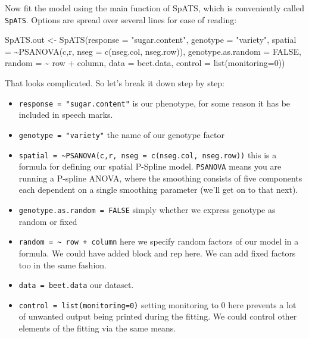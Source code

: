 \documentclass[
]{book}
\newenvironment{Shaded}{\begin{snugshade}}{\end{snugshade}}
\newcommand{\AttributeTok}[1]{\textcolor[rgb]{0.77,0.63,0.00}{#1}}
\newcommand{\ConstantTok}[1]{\textcolor[rgb]{0.00,0.00,0.00}{#1}}
\newcommand{\DecValTok}[1]{\textcolor[rgb]{0.00,0.00,0.81}{#1}}
\newcommand{\FunctionTok}[1]{\textcolor[rgb]{0.00,0.00,0.00}{#1}}
\newcommand{\NormalTok}[1]{#1}
\newcommand{\OtherTok}[1]{\textcolor[rgb]{0.56,0.35,0.01}{#1}}
\newcommand{\SpecialCharTok}[1]{\textcolor[rgb]{0.00,0.00,0.00}{#1}}
\newcommand{\StringTok}[1]{\textcolor[rgb]{0.31,0.60,0.02}{#1}}
\providecommand{\tightlist}{%
  \setlength{\itemsep}{0pt}\setlength{\parskip}{0pt}}
\begin{document}
Now fit the model using the main function of SpATS, which is conveniently called \texttt{SpATS}. Options are spread over several lines for ease of reading:

\begin{Shaded}
\begin{Highlighting}[]
\NormalTok{SpATS.out }\OtherTok{\textless{}{-}} \FunctionTok{SpATS}\NormalTok{(}\AttributeTok{response =} \StringTok{"sugar.content"}\NormalTok{,}
    \AttributeTok{genotype =} \StringTok{"variety"}\NormalTok{,}
    \AttributeTok{spatial =} \SpecialCharTok{\textasciitilde{}}\FunctionTok{PSANOVA}\NormalTok{(c,r, }\AttributeTok{nseg =} \FunctionTok{c}\NormalTok{(nseg.col, nseg.row)),}
    \AttributeTok{genotype.as.random =} \ConstantTok{FALSE}\NormalTok{,}
    \AttributeTok{random =} \SpecialCharTok{\textasciitilde{}}\NormalTok{ row }\SpecialCharTok{+}\NormalTok{ column,}
    \AttributeTok{data =}\NormalTok{ beet.data,}
    \AttributeTok{control =} \FunctionTok{list}\NormalTok{(}\AttributeTok{monitoring=}\DecValTok{0}\NormalTok{))}
\end{Highlighting}
\end{Shaded}

That looks complicated. So let's break it down step by step:

\begin{itemize}
\tightlist
\item
  \texttt{response\ =\ "sugar.content"} is our phenotype, for some reason it has be included in speech marks.
\item
  \texttt{genotype\ =\ "variety"} the name of our genotype factor\\
\item
  \texttt{spatial\ =\ \textasciitilde{}PSANOVA(c,r,\ nseg\ =\ c(nseg.col,\ nseg.row))} this is a formula for defining our spatial P-Spline model. \texttt{PSANOVA} means you are running a P-spline ANOVA, where the smoothing consists of five components each dependent on a single smoothing parameter (we'll get on to that next).
\item
  \texttt{genotype.as.random\ =\ FALSE} simply whether we express genotype as random or fixed
\item
  \texttt{random\ =\ \textasciitilde{}\ row\ +\ column} here we specify random factors of our model in a formula. We could have added block and rep here. We can add fixed factors too in the same fashion.
\item
  \texttt{data\ =\ beet.data} our dataset.
\item
  \texttt{control\ =\ list(monitoring=0)} setting monitoring to 0 here prevents a lot of unwanted output being printed during the fitting. We could control other elements of the fitting via the same means.
\end{itemize}
\end{document}
